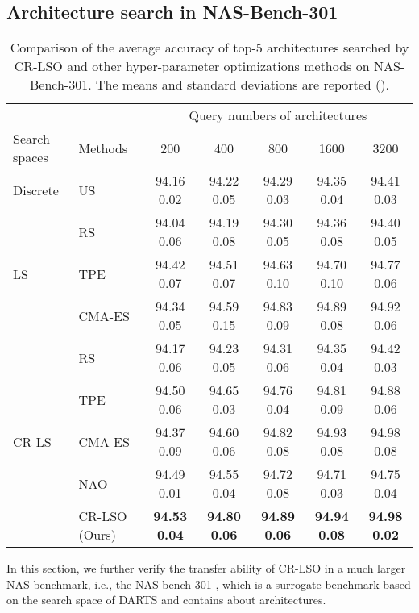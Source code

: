 \documentclass[10pt,twocolumn,letterpaper]{article}
\begin{document}
\subsection{Architecture search in NAS-Bench-301}
\begin{table*}[htbp]
	\centering
	\caption{Comparison of the average accuracy of top-5 architectures searched by CR-LSO and other hyper-parameter optimizations methods on NAS-Bench-301. The means and standard deviations are reported ().}
	\begin{tabular}{llccccc}
		\toprule
		{} & \textsc{{}} & \multicolumn{5}{c}{Query numbers of architectures}   \\
		\cline{3-7} \specialrule{0em}{1.5pt}{2.0pt}
		Search spaces & Methods &  200 & 400 & 800 & 1600 & 3200  \\
		\midrule
		Discrete & US & 94.16  0.02 & 94.22  0.05 & 94.29  0.03 & 94.35  0.04 & 94.41  0.03 \\   
		\midrule
		\multirow{3}{*}{LS} & RS \cite{bergstra2012random} & 94.04  0.06 & 94.19  0.08 & 94.30  0.05 & 94.36  0.08 & 94.40  0.05  \\
		{} & TPE \cite{bergstra2013making} & 94.42  0.07 & 94.51  0.07 & 94.63  0.10 & 94.70  0.10 & 94.77  0.06 \\
		{} & CMA-ES \cite{nomura2021warm} & 94.34  0.05 & 94.59  0.15 & 94.83  0.09 & 94.89  0.08 & 94.92  0.06 \\
		\midrule 
		\multirow{5}{*}{CR-LS} & RS \cite{bergstra2012random} & 94.17  0.06 & 94.23  0.05 & 94.31  0.06 & 94.35  0.04 & 94.42  0.03 \\ 
		{} & TPE \cite{bergstra2013making} & 94.50  0.06 & 94.65  0.03 & 94.76  0.04 & 94.81  0.09 & 94.88  0.06 \\ 
		{} & CMA-ES \cite{nomura2021warm} & 94.37  0.09 & 94.60  0.06 & 94.82  0.08 & 94.93  0.08 & 94.98   0.08 \\ 
		{} & NAO \cite{luo2018neural} & 94.49  0.01 & 94.55  0.04 & 94.72  0.08 & 94.71  0.03 & 94.75  0.04 \\ 
		{} & CR-LSO (Ours) & \textbf{94.53  0.04} & \textbf{94.80  0.06} & \textbf{94.89  0.06} & \textbf{94.94  0.08} & \textbf{94.98  0.02} \\ 
		\bottomrule
	\end{tabular}
	\label{tab:top-5_performance}
\end{table*}
In this section, we further verify the transfer ability of CR-LSO in a much larger NAS benchmark, i.e., the NAS-bench-301 \cite{siems2020bench}, which is a surrogate benchmark  based on the search space of DARTS \cite{liu2018darts} and contains about  architectures.
\end{document}
